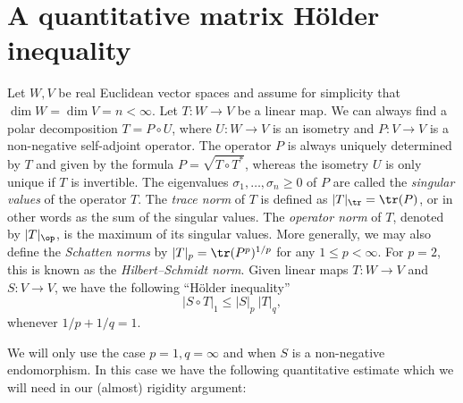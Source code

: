 \documentclass[a4paper,11pt]{amsart}
\numberwithin{equation}{section}
\begin{document}
\section{A quantitative matrix Hölder inequality}
\label{appendix:matrix_norms}
Let \(W, V\) be real Euclidean vector spaces and assume for simplicity that \(\dim W = \dim V = n < \infty\).
Let \(T \colon W \to V\) be a linear map.
We can always find a polar decomposition \(T = P \circ U\), where \(U \colon W \to V\) is an isometry and \(P \colon V \to V\) is a non-negative self-adjoint operator.
The operator \(P\) is always uniquely determined by \(T\) and given by the formula \(P = \sqrt{T \circ T^\ast}\), whereas the isometry \(U\) is only unique if \(T\) is invertible.
The eigenvalues \(\sigma_1, \dotsc, \sigma_n \geq 0\) of \(P\) are called the \emph{singular values} of the operator \(T\).
The \emph{trace norm} of \(T\) is defined as \(|T |_{\tr} = \tr(P)\), or in other words as the sum of the singular values. 
The \emph{operator norm} of \(T\), denoted by \(|T|_\op\), is the maximum of its singular values.
More generally, we may also define the \emph{Schatten norms} by \(|T|_p = \tr(P^p)^{1/p}\) for any $1 \leq p < \infty$.
For \(p = 2\), this is known as the \emph{Hilbert--Schmidt norm}.
Given linear maps \(T \colon W \to V\) and \(S \colon V \to V\), we have the following \enquote{Hölder inequality}
\begin{equation}\label{eq:trace_hoelder}
    |S \circ T|_{1} \leq |S|_{p}\ |T|_{q},
\end{equation}
whenever \(1/p + 1/q = 1\).

We will only use the case \(p=1, q = \infty\) and when \(S\) is a non-negative endomorphism. 
In this case we have the following quantitative estimate which we will need in our (almost) rigidity argument:
\end{document}
